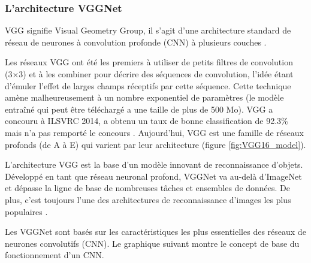 		
	\subsubsection{\textbf{L'architecture VGGNet}}\label{subsec:vggnet}
	
	VGG signifie Visual Geometry Group, il s'agit d'une architecture standard de réseau de neurones à convolution profonde (CNN) à plusieurs couches \cite{simonyan2014very}. %
	
	Les réseaux VGG ont été les premiers à utiliser de petits filtres de convolution (3×3) et à les combiner pour décrire des séquences de convolution, l'idée étant d'émuler l'effet de larges champs réceptifs par cette séquence. Cette technique amène malheureusement à un nombre exponentiel de paramètres (le modèle entraîné qui peut être téléchargé a une taille de plus de 500 Mo). VGG a concouru à ILSVRC 2014, a obtenu un taux de bonne classification de 92.3\% mais n'a pas remporté le concours \cite{krizhevsky2012imagenet}. Aujourd'hui, VGG est une famille de réseaux profonds (de A à E) qui varient par leur architecture (figure \ref{fig:VGG16_model}). %
	
	L'architecture VGG est  la base d'un modèle innovant de reconnaissance d'objets. Développé en tant que réseau neuronal profond, VGGNet va au-delà d'ImageNet et dépasse la ligne de base  de nombreuses tâches et ensembles de données. De plus, c'est toujours l'une des architectures de reconnaissance d'images les plus populaires \cite{tammina2019transfer, antoine2018apprentissage}.
	
	Les VGGNet sont basés sur les caractéristiques les plus essentielles des réseaux de neurones convolutifs (CNN). Le graphique suivant montre le concept de base du fonctionnement d'un CNN.
	
